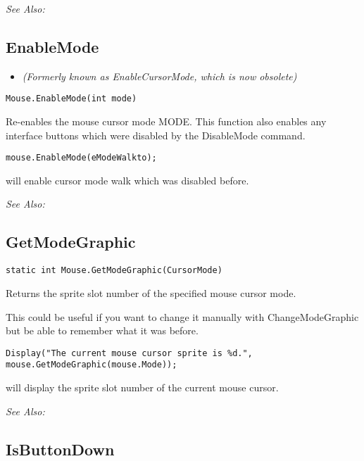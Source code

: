 \it{See Also:} 


\subsection{EnableMode}\label{Mouse.EnableMode}%

\begin{itemize}
\item \it{(Formerly known as EnableCursorMode, which is now obsolete)}
\end{itemize}

\begin{verbatim}
Mouse.EnableMode(int mode)
\end{verbatim}
Re-enables the mouse cursor mode MODE. This function also enables any
interface buttons which were disabled by the DisableMode command.

\begin{verbatim}
mouse.EnableMode(eModeWalkto);
\end{verbatim}
will enable cursor mode walk which was disabled before.

\it{See Also:} 


\subsection{GetModeGraphic}\label{Mouse.GetModeGraphic}%

\begin{verbatim}
static int Mouse.GetModeGraphic(CursorMode)
\end{verbatim}
Returns the sprite slot number of the specified mouse cursor mode.

This could be useful if you want to change it manually with ChangeModeGraphic but be able
to remember what it was before.

\begin{verbatim}
Display("The current mouse cursor sprite is %d.", mouse.GetModeGraphic(mouse.Mode));
\end{verbatim}
will display the sprite slot number of the current mouse cursor.

\it{See Also:} 


\subsection{IsButtonDown}\label{Mouse.IsButtonDown}%

